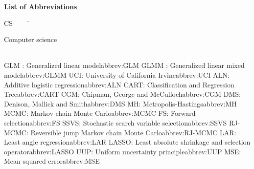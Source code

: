  
 
 
 
 
{\Huge\textbf{List of Abbreviations}}
\begin{tabbing}
CS~~~~~\=\parbox{6in}{\hspace{.4in}Computer science\dotfill \pageref{abbrev:CS}}\\
\addabbrev GLM : {\hspace{.4in}Generalized linear model}{abbrev:GLM}
\addabbrev GLMM : {\hspace{.4in}Generalized linear mixed model}{abbrev:GLMM}
\addabbrev UCI: {\hspace{.4in}University of California Irvine}{abbrev:UCI}
\addabbrev ALN: {\hspace{.4in}Additive logistic regression}{abbrev:ALN}
\addabbrev CART: {\hspace{.4in}Classification and Regression Tree}{abbrev:CART}
\addabbrev CGM: {\hspace{.4in}Chipman, George and McCulloch}{abbrev:CGM}
\addabbrev DMS: {\hspace{.4in}Denison, Mallick and Smith}{abbrev:DMS}
\addabbrev MH: {\hspace{.4in}Metropolis-Hastings}{abbrev:MH}
\addabbrev MCMC: {\hspace{.4in}Markov chain Monte Carlo}{abbrev:MCMC}
\addabbrev FS: {\hspace{.4in}Forward selection}{abbrev:FS}
\addabbrev SSVS: {\hspace{.4in}Stochastic search variable selection}{abbrev:SSVS}
\addabbrev RJ-MCMC: {\hspace{.4in}Reversible jump Markov chain Monte Carlo}{abbrev:RJ-MCMC}
\addabbrev LAR: {\hspace{.4in}Least angle regression}{abbrev:LAR}
\addabbrev LASSO: {\hspace{.4in}Least absolute shrinkage and selection operator}{abbrev:LASSO}
\addabbrev UUP: {\hspace{.4in}Uniform uncertainty principle}{abbrev:UUP}
\addabbrev MSE: {\hspace{.4in}Mean squared error}{abbrev:MSE}

\end{tabbing}
